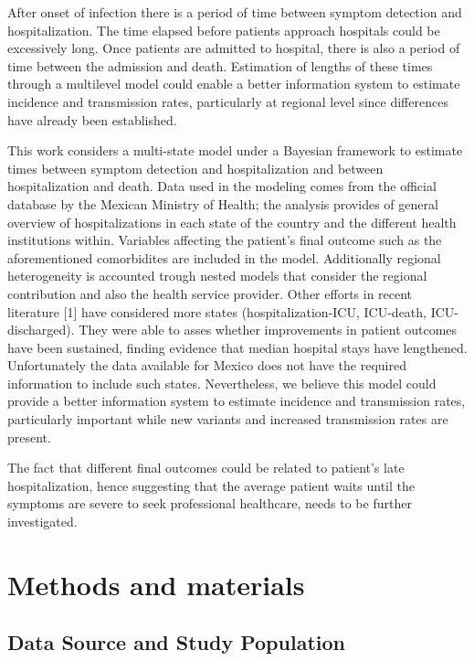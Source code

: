 \documentclass[10pt,letterpaper]{article}
\begin{document}
After onset of infection there is a period of time between symptom
detection and hospitalization. The time elapsed before patients approach
hospitals could be excessively long. Once patients are admitted to
hospital, there is also a period of time between the admission and
death. Estimation of lengths of these times through a multilevel model
could enable a better information system to estimate incidence and
transmission rates, particularly at regional level since differences
have already been established.

This work considers a multi-state model under a Bayesian framework to
estimate times between symptom detection and hospitalization and between
hospitalization and death. Data used in the modeling comes from the
official database by the Mexican Ministry of Health; the analysis
provides of general overview of hospitalizations in each state of the
country and the different health institutions within. Variables
affecting the patient's final outcome such as the aforementioned
comorbidites are included in the model. Additionally regional
heterogeneity is accounted trough nested models that consider the
regional contribution and also the health service provider. Other
efforts in recent literature {[}1{]} have considered more states
(hospitalization-ICU, ICU-death, ICU-discharged). They were able to
asses whether improvements in patient outcomes have been sustained,
finding evidence that median hospital stays have lengthened.
Unfortunately the data available for Mexico does not have the required
information to include such states. Nevertheless, we believe this model
could provide a better information system to estimate incidence and
transmission rates, particularly important while new variants and
increased transmission rates are present.

The fact that different final outcomes could be related to patient's
late hospitalization, hence suggesting that the average patient waits
until the symptoms are severe to seek professional healthcare, needs to
be further investigated.

\hypertarget{methods-and-materials}{%
\section{Methods and materials}\label{methods-and-materials}}

\hypertarget{data-source-and-study-population}{%
\subsection{Data Source and Study
Population}\label{data-source-and-study-population}}
\end{document}
